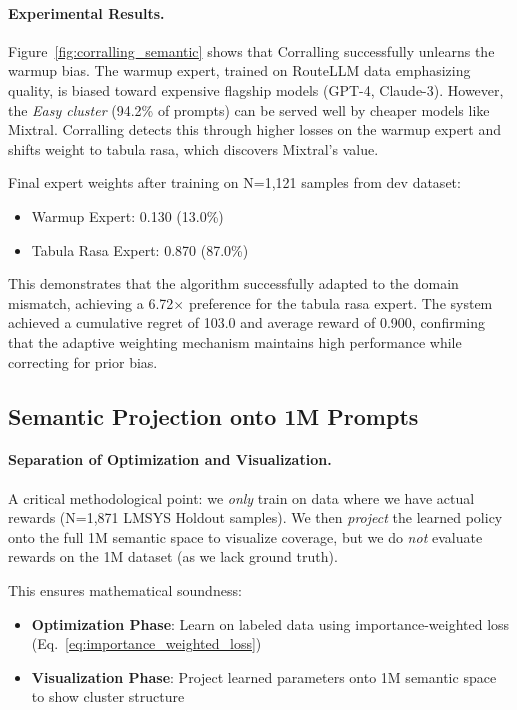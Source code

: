 \paragraph{Experimental Results.}
Figure~\ref{fig:corralling_semantic} shows that Corralling successfully unlearns the warmup bias.
The warmup expert, trained on RouteLLM data emphasizing quality, is biased toward expensive flagship models (GPT-4, Claude-3).
However, the \emph{Easy cluster} (94.2\% of prompts) can be served well by cheaper models like Mixtral.
Corralling detects this through higher losses on the warmup expert and shifts weight to tabula rasa, which discovers Mixtral's value.

Final expert weights after training on N=1,121 samples from dev dataset:
\begin{itemize}[nosep]
    \item Warmup Expert: 0.130 (13.0\%)
    \item Tabula Rasa Expert: 0.870 (87.0\%)
\end{itemize}

This demonstrates that the algorithm successfully adapted to the domain mismatch, achieving a 6.72$\times$ preference for the tabula rasa expert.
The system achieved a cumulative regret of 103.0 and average reward of 0.900, confirming that the adaptive weighting mechanism maintains high performance while correcting for prior bias.



\subsection{Semantic Projection onto 1M Prompts}
\label{sec:semantic_projection}

\paragraph{Separation of Optimization and Visualization.}
A critical methodological point: we \emph{only} train on data where we have actual rewards (N=1,871 LMSYS Holdout samples).
We then \emph{project} the learned policy onto the full 1M semantic space to visualize coverage, but we do \emph{not} evaluate rewards on the 1M dataset (as we lack ground truth).

This ensures mathematical soundness:
\begin{itemize}[nosep]
    \item \textbf{Optimization Phase}: Learn on labeled data using importance-weighted loss (Eq.~\ref{eq:importance_weighted_loss})
    \item \textbf{Visualization Phase}: Project learned parameters onto 1M semantic space to show cluster structure
\end{itemize}

